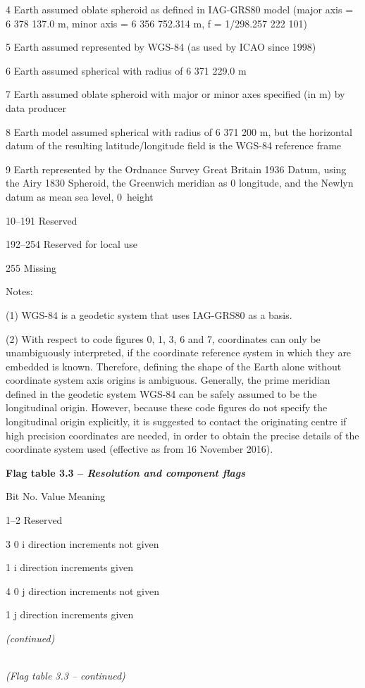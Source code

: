 4 Earth assumed oblate spheroid as defined in IAG-GRS80 model (major axis = 6 378 137.0 m, minor axis = 6 356 752.314 m, f = 1/298.257 222 101)

5 Earth assumed represented by WGS-84 (as used by ICAO since 1998)

6 Earth assumed spherical with radius of 6 371 229.0 m

7 Earth assumed oblate spheroid with major or minor axes specified (in m) by data producer

8 Earth model assumed spherical with radius of 6 371 200 m, but the horizontal datum of the resulting latitude/longitude field is the WGS-84 reference frame

9 Earth represented by the Ordnance Survey Great Britain 1936 Datum, using the Airy 1830 Spheroid, the Greenwich meridian as 0 longitude, and the Newlyn datum as mean sea level, 0~height

10--191 Reserved

192--254 Reserved for local use

255 Missing

Notes:

(1) WGS-84 is a geodetic system that uses IAG-GRS80 as a basis.

(2) With respect to code figures 0, 1, 3, 6 and 7, coordinates can only be unambiguously interpreted, if the coordinate reference system in which they are embedded is known. Therefore, defining the shape of the Earth alone without coordinate system axis origins is ambiguous. Generally, the prime meridian defined in the geodetic system WGS-84 can be safely assumed to be the longitudinal origin. However, because these code figures do not specify the longitudinal origin explicitly, it is suggested to contact the originating centre if high precision coordinates are needed, in order to obtain the precise details of the coordinate system used (effective as from 16 November 2016).

\textbf{Flag table 3.3 -- \emph{Resolution and component flags}}

Bit No. Value Meaning

1--2 Reserved

3 0 i direction increments not given

1 i direction increments given

4 0 j direction increments not given

1 j direction increments given

\emph{(continued)}

\emph{\\
(Flag table 3.3 -- continued)}

